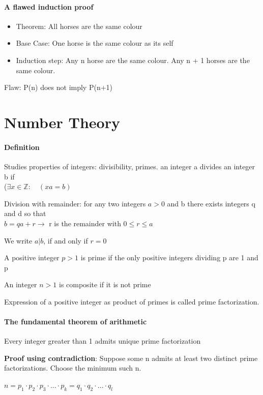 \documentclass[9pt, letterpaper, oneside]{article}
\begin{document}
\paragraph{A flawed induction proof}
\begin{itemize}
	\item Theorem: All horses are the same colour
	\item Base Case: One horse is the same colour as its self
	\item Induction step: Any n horse are the same colour. Any n + 1 horses are the same colour.
\end{itemize}

Flaw: P(n) does not imply P(n+1)

\section{Number Theory}

\paragraph{Definition}
Studies properties of integers: divisibility, primes. an integer a divides an integer b if \\ ($ \exists x \in \mathbb{Z} : \quad (xa=b)$

Division with remainder: for any two integers $a > 0$ and b there exists integers q and d  so that \\ $b = qa + r \to$ r is the remainder with $0 \leq r \leq a$

We write $a | b$, if and only if $r = 0$

A positive integer $p > 1$ is prime if the only positive integers dividing p are 1 and p

An integer $n > 1$ is composite if it is not prime

Expression of a positive integer as product of primes is called prime factorization.

\paragraph{The fundamental theorem of arithmetic} Every integer greater than 1 admits unique prime factorization

\textbf{Proof using contradiction}: Suppose some n admits at least two distinct prime factorizations. Choose the minimum such n.

$n = p_1 \cdot p_2 \cdot p_3 \cdot ... \cdot p_k = q_1\cdot q_2 \cdot ...\cdot q_l$
\end{document}
